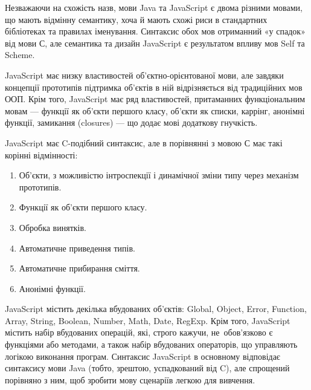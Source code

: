 \documentclass[../main.tex]{subfiles}
\begin{document}
		Незважаючи на схожість назв, мови Java та JavaScript є двома різними мовами, що мають відмінну семантику, хоча й мають схожі риси в стандартних бібліотеках та правилах іменування. Синтаксис обох мов отриманний «у спадок» від мови С, але семантика та дизайн JavaScript є результатом впливу мов Self та Scheme.
		
		JavaScript має низку властивостей об'єктно-орієнтованої мови, але завдяки концепції прототипів підтримка об'єктів в ній відрізняється від традиційних мов ООП. Крім того, JavaScript має ряд властивостей, притаманних функціональним мовам — функції як об'єкти першого класу, об'єкти як списки, каррінг, анонімні функції, замикання (closures) — що додає мові додаткову гнучкість.
		
		JavaScript має C-подібний синтаксис, але в порівнянні з мовою С має такі корінні відмінності:
		\begin{enumerate}
			\item Об'єкти, з можливістю інтроспекції і динамічної зміни типу через механізм прототипів.
			\item Функції як об'єкти першого класу.
			\item Обробка винятків.
			\item Автоматичне приведення типів.
			\item Автоматичне прибирання сміття.
			\item Анонімні функції.
		\end{enumerate}
		
		JavaScript містить декілька вбудованих об'єктів: Global, Object, Error, Function, Array, String, Boolean, Number, Math, Date, RegExp. Крім того, JavaScript містить набір вбудованих операцій, які, строго кажучи, не~обов'язково є функціями або методами, а також набір вбудованих операторів, що управляють логікою виконання програм. Синтаксис JavaScript в основному відповідає синтаксису мови Java (тобто, зрештою, успадкований від C), але спрощений порівняно з ним, щоб зробити мову сценаріїв легкою для вивчення.
	
\end{document}
